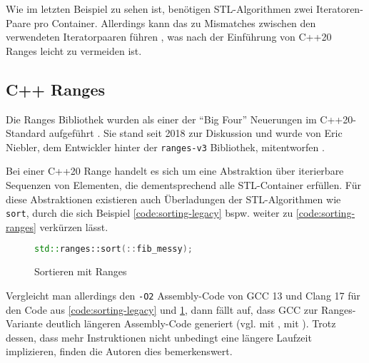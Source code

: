 \documentclass[runningheads]{llncs}
\begin{document}

\noindent Wie im letzten Beispiel zu sehen ist, benötigen STL-Algorithmen zwei Iteratoren-Paare pro Container.
Allerdings kann das zu Mismatches zwischen den verwendeten Iteratorpaaren führen \cite{profcpp}, was nach der Einführung von C++20 Ranges leicht zu vermeiden ist.

\subsection{C++ Ranges}

Die Ranges Bibliothek wurden als einer der \enquote{Big Four} Neuerungen im C++20-Standard aufgeführt \cite{open-std.org}.
Sie stand seit 2018 zur Diskussion \cite{the-one-ranges-proposal} und wurde von Eric Niebler, dem Entwickler hinter der \texttt{ranges-v3} Bibliothek, mitentworfen \cite{ranges-v3}.

Bei einer C++20 Range handelt es sich um eine Abstraktion über iterierbare Sequenzen von Elementen, die dementsprechend alle STL-Container erfüllen.
Für diese Abstraktionen existieren auch Überladungen der STL-Algorithmen wie \texttt{sort}, durch die sich Beispiel \ref{code:sorting-legacy} bspw. weiter zu \autoref{code:sorting-ranges} verkürzen lässt.

\begin{figure}[H]
	\vspace{-.5em}
	\caption{Sortieren mit Ranges}
	\label{code:sorting-ranges}

	\begin{lstlisting}[language=C++]
	std::ranges::sort(::fib_messy);\end{lstlisting}
	\vspace{-1em}
\end{figure}

\noindent Vergleicht man allerdings den \texttt{-O2} Assembly-Code von GCC 13 und Clang 17 für den Code aus \autoref{code:sorting-legacy} und \ref{code:sorting-ranges}, dann fällt auf, dass GCC zur Ranges-Variante deutlich längeren Assembly-Code generiert (vgl. \cite{compexp2:clang-leg} mit \cite{compexp2:clang-ranges}, \cite{compexp2:gcc-leg} mit \cite{compexp2:gcc-ranges}).
Trotz dessen, dass mehr Instruktionen nicht unbedingt eine längere Laufzeit implizieren, finden die Autoren dies bemerkenswert.
\end{document}
